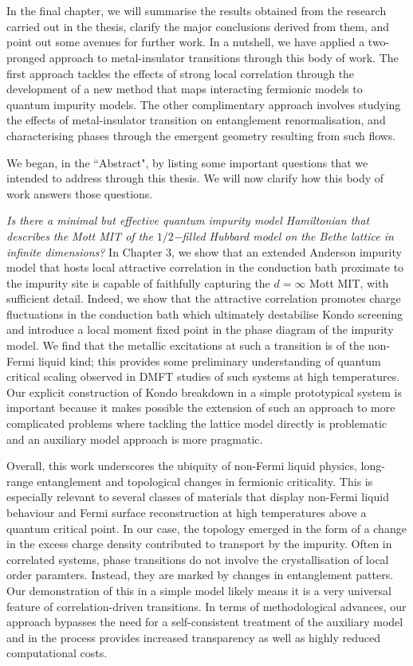\chapter{\chapH}
In the final chapter, we will summarise the results obtained from the research carried out in the thesis, clarify the major conclusions derived from them, and point out some avenues for further work. In a nutshell, we have applied a two-pronged approach to metal-insulator transitions through this body of work. The first approach tackles the effects of strong local correlation through the development of a new method that maps interacting fermionic models to quantum impurity models. The other complimentary approach involves studying the effects of metal-insulator transition on entanglement renormalisation, and characterising phases through the emergent geometry resulting from such flows.

We began, in the ``Abstract", by listing some important questions that we intended to address through this thesis. We will now clarify how this body of work answers those questions.

{\it Is there a minimal but effective quantum impurity model Hamiltonian that describes the Mott MIT of the \(1/2\)−filled Hubbard model on the Bethe lattice in infinite dimensions?} In Chapter 3, we show that an extended Anderson impurity model that hosts local attractive correlation in the conduction bath proximate to the impurity site is capable of faithfully capturing the \(d=\infty\) Mott MIT, with sufficient detail. Indeed, we show that the attractive correlation promotes charge fluctuations in the conduction bath which ultimately destabilise Kondo screening and introduce a local moment fixed point in the phase diagram of the impurity model. We find that the metallic excitations at such a transition is of the non-Fermi liquid kind; this provides some preliminary understanding of quantum critical scaling observed in DMFT studies of such systems at high temperatures. Our explicit construction of Kondo breakdown in a simple prototypical system is important because it makes possible the extension of such an approach to more complicated problems where tackling the lattice model directly is problematic and an auxiliary model approach is more pragmatic. 

Overall, this work underscores the ubiquity of non-Fermi liquid physics, long-range entanglement and topological changes in fermionic criticality. This is especially relevant to several classes of materials that display non-Fermi liquid behaviour and Fermi surface reconstruction at high temperatures above a quantum critical point. In our case, the topology emerged in the form of a change in the excess charge density contributed to transport by the impurity. Often in correlated systems, phase transitions do not involve the crystallisation of local order paramters. Instead, they are marked by changes in entanglement patters. Our demonstration of this in a simple model likely means it is a very universal feature of correlation-driven transitions. In terms of methodological advances, our approach bypasses the need for a self-consistent treatment of the auxiliary model and in the process provides increased transparency as well as highly reduced computational costs. 

